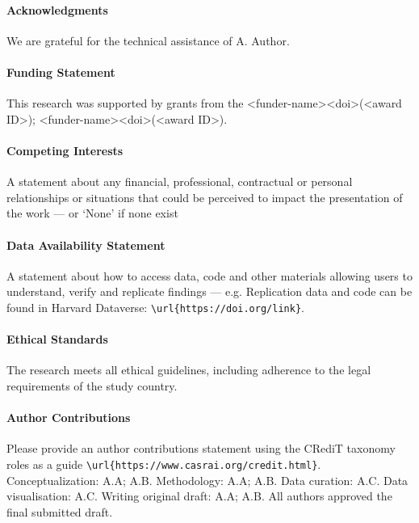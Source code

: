 \documentclass[journal=gmj]{CUP-JNL-DTM}%
\theoremstyle{definition}
\numberwithin{equation}{section}
\begin{document}
\begin{Backmatter}

\paragraph{Acknowledgments}
We are grateful for the technical assistance of A. Author.


\paragraph{Funding Statement}
This research was supported by grants from the <funder-name><doi>(<award ID>); <funder-name><doi>(<award ID>).

\paragraph{Competing Interests}
A statement about any financial, professional, contractual or personal relationships or situations that could be perceived to impact the presentation of the work --- or `None' if none exist

\paragraph{Data Availability Statement}
A statement about how to access data, code and other materials allowing users to understand, verify and replicate findings --- e.g. Replication data and code can be found in Harvard Dataverse: \verb+\url{https://doi.org/link}+.

\paragraph{Ethical Standards}
The research meets all ethical guidelines, including adherence to the legal requirements of the study country.

\paragraph{Author Contributions}
Please provide an author contributions statement using the CRediT taxonomy roles as a guide {\verb+\url{https://www.casrai.org/credit.html}+}. Conceptualization: A.A; A.B. Methodology: A.A; A.B. Data curation: A.C. Data visualisation: A.C. Writing original draft: A.A; A.B. All authors approved the final submitted draft.


\renewcommand\bibpreamble{By default, this template uses \texttt{bibtex} and adopts the AMS referencing style. However, the journal you’re submitting to may require a different reference style; specify the journal you're using with the class' \texttt{journal} option --- see lines 1--19 of \emph{sample.tex} for a list of options and instructions for selecting the journal.}



\end{Backmatter}
\end{document}
